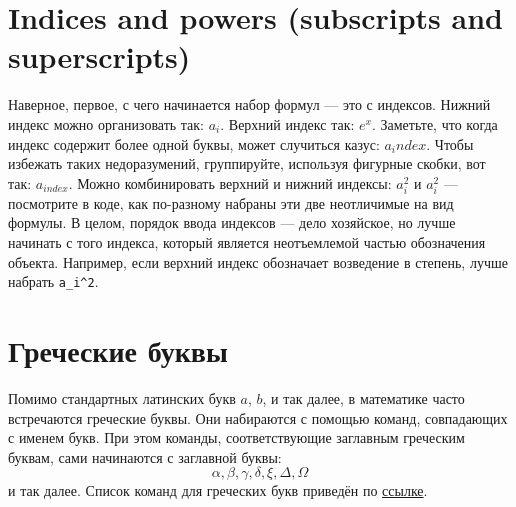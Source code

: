 \section{Indices and powers (subscripts and superscripts)}
\par Наверное, первое, с чего начинается набор формул --- это с индексов.
Нижний индекс можно организовать так: \(a_i\).
Верхний индекс так: \(e^x\).
Заметьте, что когда индекс содержит более одной буквы, может случиться казус: $a_index$. Чтобы избежать таких недоразумений, группируйте, используя фигурные скобки, вот так: $a_{index}$.
Можно комбинировать верхний и нижний индексы: $a_i^2$ и $a^2_i$ --- посмотрите в коде, как по-разному набраны эти две неотличимые на вид формулы. В целом, порядок ввода индексов --- дело хозяйское, но лучше начинать с того индекса, который является неотъемлемой частью обозначения объекта. Например, если верхний индекс обозначает возведение в степень, лучше набрать \verb"a_i^2".

\section{Греческие буквы}
\par Помимо стандартных латинских букв $a$, $b$, и так далее, в математике часто встречаются греческие буквы. Они набираются с помощью команд, совпадающих с именем букв. При этом команды, соответствующие заглавным греческим буквам, сами начинаются с заглавной буквы:
\[\alpha, \beta, \gamma, \delta, \xi, \Delta, \Omega\]
и так далее. Список команд для греческих букв приведён по \href{https://www.latex-tutorial.com/symbols/greek-alphabet/}{ссылке}.

